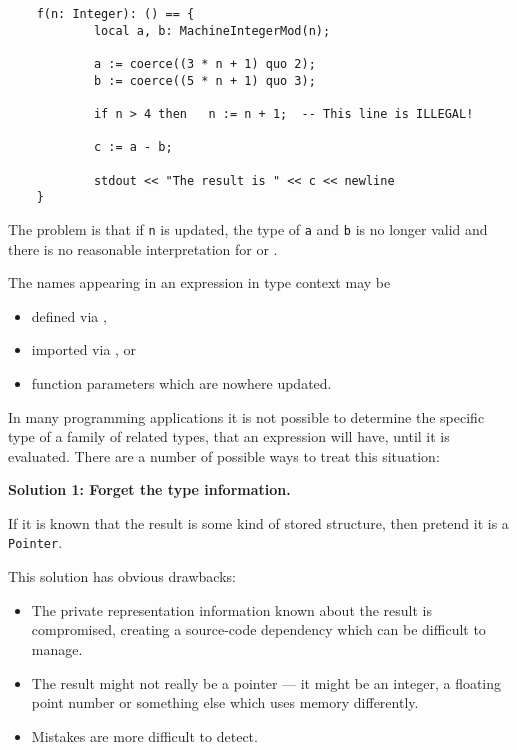 \begin{small}
\begin{verbatim}
    f(n: Integer): () == {
            local a, b: MachineIntegerMod(n);

            a := coerce((3 * n + 1) quo 2);
            b := coerce((5 * n + 1) quo 3);

            if n > 4 then   n := n + 1;  -- This line is ILLEGAL!

            c := a - b;

            stdout << "The result is " << c << newline
    }
\end{verbatim}
\end{small}

The problem is that if \verb"n" is updated,
the type of \verb"a" and \verb"b" is no longer valid
and there is no reasonable interpretation for \ttin{-} or .

The names appearing in an expression in type context may be
\begin{itemize}
\item defined via \ttin{==},
\item imported via , or
\item function parameters which are nowhere updated.
\end{itemize}


In many programming applications it is not possible to determine the
specific type of a family of related types, that an expression will
have, until it is evaluated.  There are a number of possible ways to
treat this situation:

{\bf Solution 1: Forget the type information.}

If it is known that the result is some kind of stored structure, 
then pretend it is a \verb"Pointer".

This solution has obvious drawbacks: 
\begin{itemize}
\item
    The private representation information known about the result is
    compromised, creating a source-code dependency which can be difficult
    to manage. 
\item
    The result might not really be a pointer --- it might be an integer,
    a floating point number or something else which uses memory differently.
\item
    Mistakes are more difficult to detect.
\end{itemize}


